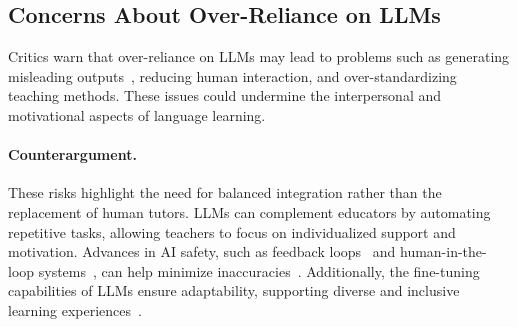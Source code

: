 \subsection{Concerns About Over-Reliance on LLMs}
Critics warn that over-reliance on LLMs may lead to problems such as generating misleading outputs~\cite{nahar2024fakes}, reducing human interaction, and over-standardizing teaching methods. These issues could undermine the interpersonal and motivational aspects of language learning.

\paragraph{Counterargument.} These risks highlight the need for balanced integration rather than the replacement of human tutors. LLMs can complement educators by automating repetitive tasks, allowing teachers to focus on individualized support and motivation. Advances in AI safety, such as feedback loops~\cite{tong2024can} and human-in-the-loop systems~\cite{wu2022survey}, can help minimize inaccuracies~\cite{ho2024mitigating}. Additionally, the fine-tuning capabilities of LLMs ensure adaptability, supporting diverse and inclusive learning experiences~\cite{lee2024human}.


